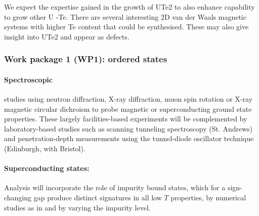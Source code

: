 We expect the expertise gained in the growth of UTe2 to also enhance capability to grow other U -Te.  There are several interesting 2D van der Waals magnetic systems with higher Te content that could be synthesised. These may also give insight into UTe2 and appear as defects.

\subsubsection*{Work package 1 (WP1): ordered states}
\noindent
\paragraph{Spectroscopic} studies using neutron diffraction, X-ray diffraction, muon spin rotation or X-ray magnetic circular dichroism to probe magnetic or superconducting ground state properties. These largely facilities-based experiments will be complemented by laboratory-based studies such as scanning tunneling spectroscopy (St. Andrews) and penetration-depth measurements using the tunnel-diode oscillator technique (Edinburgh, with Bristol).

\paragraph{Superconducting states:}
Analysis will incorporate the role of impurity bound states, which for a sign-changing gap produce distinct signatures in  all low $T$ properties, by numerical studies as in \cite{bang17} and by varying the impurity level.


